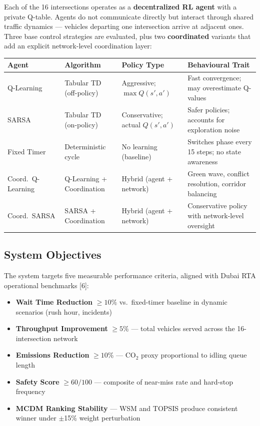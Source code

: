 \documentclass[11pt, a4paper]{article}
\begin{document}
Each of the 16 intersections operates as a \textbf{decentralized RL agent} with a private Q-table. Agents do not communicate directly but interact through shared traffic dynamics --- vehicles departing one intersection arrive at adjacent ones. Three base control strategies are evaluated, plus two \textbf{coordinated} variants that add an explicit network-level coordination layer:

\begin{table}[H]
\centering
\small
\begin{tabularx}{\textwidth}{l l l X}
    \toprule
    \textbf{Agent} & \textbf{Algorithm} & \textbf{Policy Type} & \textbf{Behavioural Trait} \\
    \midrule
    Q-Learning & Tabular TD (off-policy) & Aggressive; $\max Q(s',a')$ & Fast convergence; may overestimate Q-values \\
    SARSA & Tabular TD (on-policy) & Conservative; actual $Q(s',a')$ & Safer policies; accounts for exploration noise \\
    Fixed Timer & Deterministic cycle & No learning (baseline) & Switches phase every 15 steps; no state awareness \\
    Coord.\ Q-Learning & Q-Learning + Coordination & Hybrid (agent + network) & Green wave, conflict resolution, corridor balancing \\
    Coord.\ SARSA & SARSA + Coordination & Hybrid (agent + network) & Conservative policy with network-level oversight \\
    \bottomrule
\end{tabularx}
\end{table}

\subsection{System Objectives}

The system targets five measurable performance criteria, aligned with Dubai RTA operational benchmarks [6]:

\begin{itemize}[nosep, leftmargin=*]
    \item \textbf{Wait Time Reduction} $\geq 10\%$ vs.\ fixed-timer baseline in dynamic scenarios (rush hour, incidents)
    \item \textbf{Throughput Improvement} $\geq 5\%$ --- total vehicles served across the 16-intersection network
    \item \textbf{Emissions Reduction} $\geq 10\%$ --- CO$_2$ proxy proportional to idling queue length
    \item \textbf{Safety Score} $\geq 60/100$ --- composite of near-miss rate and hard-stop frequency
    \item \textbf{MCDM Ranking Stability} --- WSM and TOPSIS produce consistent winner under $\pm$15\% weight perturbation
\end{itemize}
\end{document}
